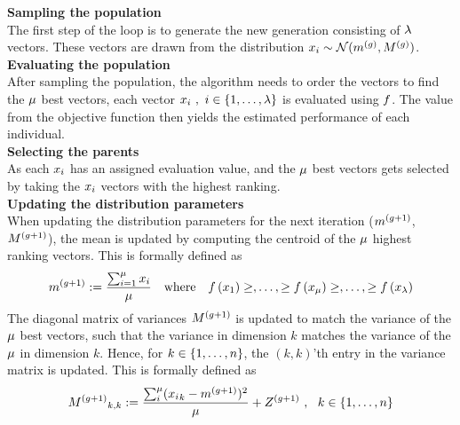 \textbf{Sampling the population}\\
The first step of the loop is to generate the new generation 
consisting of $\lambda$ vectors. 
These vectors are drawn from the distribution 
$x_{i}\sim \mathcal{N}(m^{(g)},M^{(g)})$.
\\

\textbf{Evaluating the population}\\
After sampling the population, the algorithm needs to order the vectors to find the $\mu$ best vectors, each vector $x_{i}\ ,\ i \in \{1, \dots, \lambda\}$ is evaluated using $f$. 
The value from the objective function then yields 
the estimated performance of each individual.
\\

\textbf{Selecting the parents}\\
As each $x_{i}$ has an assigned evaluation value, and the 
$\mu$ best vectors gets selected by 
taking the $x_{i}$ vectors with the highest ranking.
\\

\textbf{Updating the distribution parameters}\\
When updating the distribution parameters for the next iteration
($m^{(g + 1)}$,$M^{(g + 1)}$), 
the mean is updated by computing the centroid of the 
$\mu$ highest ranking vectors. This is formally defined as
\begin{align}
\mean^{(\generation +1)}:=\frac{\sum_{i=1}^{\offspringNumber} \individual_{i}}{\offspringNumber}
\ \ \ 
\text{where}
\ \ \ 
\fitnessFunction \left( \individual_{1} \right) \geq, \dots, 
\geq \fitnessFunction \left( \individual_{\offspringNumber} \right) \geq, 
\dots, \geq \fitnessFunction \left( \individual_{\populationSize} \right)
\end{align}
The diagonal matrix of variances $M^{(g + 1)}$ is updated 
to match the variance of the $\mu$ best
vectors, such that the variance in dimension $k$ 
matches the variance of the $\mu$
in dimension $k$. Hence, for $k \in \{ 1,\dots,n \}$,
the $(k,k)$'th entry in the variance matrix is 
updated. 
This is formally defined as
\begin{align}
{M^{(g+1)}}_{k,k}:=\frac{\sum_{i}^{\mu}
({x_{i}}_k - m^{(g +1)})^2}{\mu} + 
Z^{(g + 1)}\ ,\ \ k \in \{ 1,\dots,n \}
\end{align}